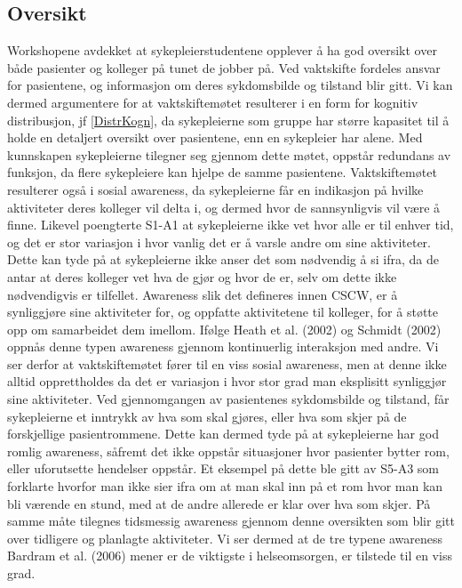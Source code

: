 \subsection{Oversikt}
\label{oversikt}
Workshopene avdekket at sykepleierstudentene opplever å ha god oversikt over både pasienter og kolleger på tunet de jobber på. Ved vaktskifte fordeles ansvar for pasientene, og informasjon om deres sykdomsbilde og tilstand blir gitt. Vi kan dermed argumentere for at vaktskiftemøtet resulterer i en form for kognitiv distribusjon, jf \ref{DistrKogn}, da sykepleierne som gruppe har større kapasitet til å holde en detaljert oversikt over pasientene, enn en sykepleier har alene. Med kunnskapen sykepleierne tilegner seg gjennom dette møtet, oppstår redundans av funksjon, da flere sykepleiere kan hjelpe de samme pasientene. Vaktskiftemøtet resulterer også i sosial awareness, da sykepleierne får en indikasjon på hvilke aktiviteter deres kolleger vil delta i, og dermed hvor de sannsynligvis vil være å finne. Likevel poengterte S1-A1 at sykepleierne ikke vet hvor alle er til enhver tid, og det er stor variasjon i hvor vanlig det er å varsle andre om sine aktiviteter. Dette kan tyde på at sykepleierne ikke anser det som nødvendig å si ifra, da de antar at deres kolleger vet hva de gjør og hvor de er, selv om dette ikke nødvendigvis er tilfellet. Awareness slik det defineres innen CSCW, er å synliggjøre sine aktiviteter for, og oppfatte aktivitetene til kolleger, for å støtte opp om samarbeidet dem imellom. Ifølge Heath et al. (2002) og Schmidt (2002) oppnås denne typen awareness gjennom kontinuerlig interaksjon med andre. Vi ser derfor at vaktskiftemøtet fører til en viss sosial awareness, men at denne ikke alltid opprettholdes da det er variasjon i hvor stor grad man eksplisitt synliggjør sine aktiviteter. Ved gjennomgangen av pasientenes sykdomsbilde og tilstand, får sykepleierne et inntrykk av  hva som skal gjøres, eller hva som skjer på de forskjellige pasientrommene. Dette kan dermed tyde på at sykepleierne har god romlig awareness, såfremt det ikke oppstår situasjoner hvor pasienter bytter rom, eller uforutsette hendelser oppstår. Et eksempel på dette ble gitt av S5-A3 som forklarte hvorfor man ikke sier ifra om at man skal inn på et rom hvor man kan bli værende en stund, med at de andre allerede er klar over hva som skjer. På samme måte tilegnes tidsmessig awareness gjennom denne oversikten som blir gitt over tidligere og planlagte aktiviteter. Vi ser dermed at de tre typene awareness Bardram et al. (2006) mener er de viktigste i helseomsorgen, er tilstede til en viss grad.

